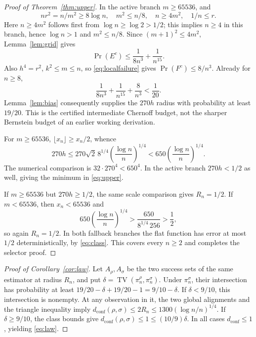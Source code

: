\documentclass[11pt]{article}
\theoremstyle{remark}
\newcommand{\TV}{\operatorname{TV}}
\newcommand{\dc}{d_{\mathrm{conf}}}
\begin{document}
\begin{proof}[Proof of Theorem~\ref{thm:upper}]
In the active branch $m\ge65536$, and
\[
 nr^2=n/m^2\ge8\log n,\quad
 m^2\le n/8,\quad n\ge4m^2,\quad 1/n\le r.
\]
Here $n\ge4m^2$ follows first from $\log n\ge\log2>1/2$;
this implies $n\ge4$ in this branch, hence $\log n>1$ and $m^2\le n/8$.
Since $(m+1)^2\le4m^2$, Lemma~\ref{lem:grid} gives
\begin{equation}\label{eq:finalgeometric}
 \Pr(E^c)\le\frac1{8n^3}+\frac1{n^{15}}.
\end{equation}
Also $h^4=r^2$, $k^2\le m\le n$, so \eqref{eq:localfailure} gives
$\Pr(F^c)\le8/n^3$. Already for $n\ge8$,
\[
 \frac1{8n^3}+\frac1{n^{15}}+\frac8{n^3}<\frac1{20}.
\]
Lemma~\ref{lem:bias} consequently supplies the $270h$ radius with
probability at least $19/20$. This is the certified intermediate
Chernoff budget, not the sharper Bernstein budget of an earlier
working derivation.

For $m\ge65536$, $\lfloor x_n\rfloor\ge x_n/2$, whence
\[
 270h\le270\sqrt2\,8^{1/4}
        \left(\frac{\log n}{n}\right)^{1/4}
 <650\left(\frac{\log n}{n}\right)^{1/4}.
\]
The numerical comparison is $32\cdot270^4<650^4$.
In the active branch $270h<1/2$ as well, giving the minimum in
\eqref{eq:upper}.

If $m\ge65536$ but $270h\ge1/2$, the same scale comparison gives
$R_n=1/2$. If $m<65536$, then $x_n<65536$ and
\[
 650\left(\frac{\log n}{n}\right)^{1/4}
 >\frac{650}{8^{1/4}\,256}>\frac12,
\]
so again $R_n=1/2$. In both fallback branches the flat function has
error at most $1/2$ deterministically, by \eqref{eq:class}.
This covers every $n\ge2$ and completes the selector proof.
\end{proof}

\begin{proof}[Proof of Corollary~\ref{cor:law}]
Let $A_\rho,A_\sigma$ be the two success sets of the same estimator
at radius $R_n$, and put $\delta=\TV(\pi_n^\rho,\pi_n^\sigma)$.
Under $\pi_n^\sigma$, their intersection has probability at least
$19/20-\delta+19/20-1=9/10-\delta$.
If $\delta<9/10$, this intersection is nonempty. At any observation
in it, the two global alignments and the triangle inequality imply
$\dc(\rho,\sigma)\le2R_n\le1300(\log n/n)^{1/4}$.
If $\delta\ge9/10$, the class bounds give
$\dc(\rho,\sigma)\le1\le(10/9)\delta$.
In all cases $\dc\le1$, yielding \eqref{eq:law}.
\end{proof}
\end{document}
